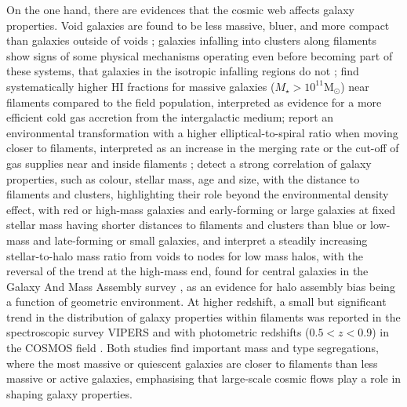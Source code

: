 \documentclass[useAMS,usenatbib]{mnras}
\begin{document}
On the one hand, there are evidences that the cosmic web affects galaxy properties. 
Void galaxies are found to be less massive, bluer, and more compact than galaxies outside of voids \citep[e.g.][]{Rojas2004,Beygu2016}; galaxies infalling into clusters along filaments show signs of some physical mechanisms operating even before becoming part of these systems,
that galaxies in the isotropic infalling regions do not \citep[][]{Porter2008, Martinez2016}; 
\citet[][]{kleiner2017} find systematically higher HI fractions for massive galaxies ($M_{\star} > 10^{11} \mathrm{M}_{\odot}$) near filaments compared to the field population, interpreted as evidence for a  more efficient cold gas accretion from the intergalactic medium; \citet[][]{Kuutma2017} report an environmental transformation with a higher elliptical-to-spiral ratio when moving closer to  filaments, interpreted as an increase in the merging rate or the cut-off of gas supplies near and inside filaments \citep[see also][]{Aragoncalvo2016}; \cite{Chen2017} detect a strong correlation of galaxy properties, such as colour, stellar mass, age and size, with the distance to filaments and clusters, highlighting their role beyond the environmental density effect,
with red or high-mass galaxies and early-forming or large galaxies at fixed stellar mass having shorter distances to filaments and clusters than blue or low-mass and late-forming or small galaxies, and \cite{Tojeiro2017} interpret a steadily increasing stellar-to-halo mass ratio from voids to nodes for low mass halos, with the reversal of the trend at the high-mass end, found for central galaxies in the Galaxy And Mass Assembly survey \citep[]{Driver2009,Driver2011}, as an evidence for halo assembly bias being a function of geometric environment.
%
At higher redshift, a small but significant trend in the distribution of galaxy properties within filaments was reported in the spectroscopic survey VIPERS \citep[$z \simeq 0.7$;][]{Malavasi2017} and with photometric redshifts ($0.5< z< 0.9$) in the COSMOS field \citep[with a 2D analysis;][]{Laigle2017}. Both studies find important mass and type segregations, where the most massive or quiescent galaxies are closer to filaments than less massive or active galaxies, emphasising that large-scale cosmic flows play a role in shaping galaxy properties.
\end{document}

